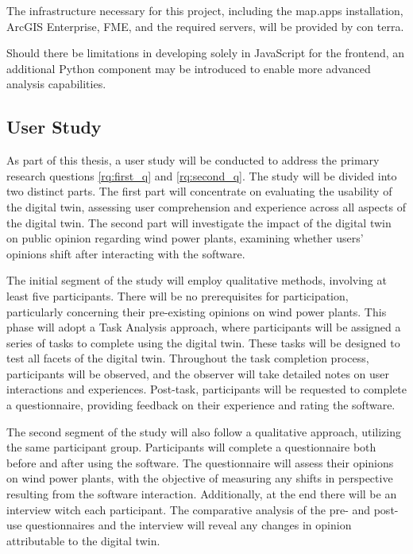 \documentclass[11pt, titlepage, a4paper]{scrartcl}
\begin{document}
\begin{linenumbers}
    The infrastructure necessary for this project, including the map.apps installation, ArcGIS Enterprise, FME, and the required servers, will be provided by con terra.

    Should there be limitations in developing solely in JavaScript for the frontend, an additional Python component may be introduced to enable more advanced analysis capabilities.


    \subsection{User Study}
    As part of this thesis, a user study will be conducted to address the primary research questions \cref{rq:first_q} and \cref{rq:second_q}. The study will be divided into two distinct parts. The first part will concentrate on evaluating the usability of the digital twin, assessing user comprehension and experience across all aspects of the digital twin. The second part will investigate the impact of the digital twin on public opinion regarding wind power plants, examining whether users' opinions shift after interacting with the software.

    The initial segment of the study will employ qualitative methods, involving at least five participants. There will be no prerequisites for participation, particularly concerning their pre-existing opinions on wind power plants. This phase will adopt a Task Analysis approach, where participants will be assigned a series of tasks to complete using the digital twin. These tasks will be designed to test all facets of the digital twin. Throughout the task completion process, participants will be observed, and the observer will take detailed notes on user interactions and experiences. Post-task, participants will be requested to complete a questionnaire, providing feedback on their experience and rating the software.

    The second segment of the study will also follow a qualitative approach, utilizing the same participant group. Participants will complete a questionnaire both before and after using the software. The questionnaire will assess their opinions on wind power plants, with the objective of measuring any shifts in perspective resulting from the software interaction. Additionally, at the end there will be an interview witch each participant. The comparative analysis of the pre- and post-use questionnaires and the interview will reveal any changes in opinion attributable to the digital twin.


\end{linenumbers}
\end{document}
